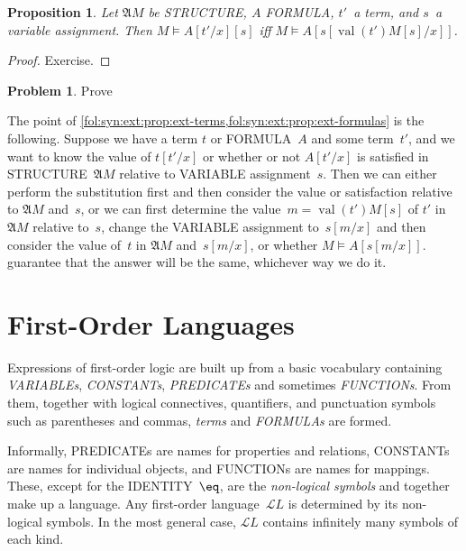 \documentclass[10pt,a4paper]{article}
\makeatletter
\newcommand*{\olup}[1]{\MakeUppercase{#1}}
\theoremstyle{plain}
\newtheorem{prop}[thm]{Proposition}
\theoremstyle{definition}
\newtheorem{prob}{Problem}[section]
\theoremstyle{remark}
\newenvironment{explain}{}{}
\newcommand*{\olfileid}[3]{}
\newcommand*{\olsection}[1]{\section*{#1}}
\newcommand*{\ollabel}[1]{\label{#1}}
\newcommand{\olref}{\@ifnextchar[{\olref@i}{\olref@final}}
\def\olref@i[#1]{\@ifnextchar[{\olref@ii}{\olref@final}}
\def\olref@ii[#1]{\@ifnextchar[{\olref@iii}{\olref@final}}
\def\olref@iii[#1]{\olref@final}
\def\olref@final#1{\ref{#1}}
\providecommand{\Subst}[3]{#1[#2/#3]}
\providecommand{\Struct}{\ensuremath{\mathfrak{A}}}
\providecommand{\Sat}[2]{\ensuremath{#1 \models #2}}
\providecommand{\Lang}{\ensuremath{\mathcal{L}}}
\providecommand{\Value}[1]{\operatorname{val}(#1)}
\providecommand{\cref}[1]{\ref{#1}}
\makeatother
\begin{document}
\begin{prop}\ollabel{prop:ext-formulas} Let $\Struct M$ be
\olup{structure}, $A$ \olup{formula}, $t'$~a term, and $s$~a variable
assignment. Then $\Sat{M}{\Subst{A}{t'}{x}}[s]$ iff
$\Sat{M}{A}[\Subst{s}{\Value{t'}{M}[s]}{x}]$.
\end{prop}

\begin{proof}
Exercise.
\end{proof}

\begin{prob}
Prove \olref[fol][syn][ext]{prop:ext-formulas}
\end{prob}

\begin{explain}
  The point of
  \cref{fol:syn:ext:prop:ext-terms,fol:syn:ext:prop:ext-formulas} is
  the following. Suppose we have a term $t$ or \olup{formula}~$A$ and
  some term~$t'$, and we want to know the value of $\Subst{t}{t'}{x}$
  or whether or not $\Subst{A}{t'}{x}$ is satisfied in
  \olup{structure}~$\Struct M$ relative to \olup{variable} assignment~$s$.
  Then we can either perform the substitution first and then consider
  the value or satisfaction relative to $\Struct{M}$ and~$s$, or we
  can first determine the value~$m = \Value{t'}{M}[s]$ of $t'$ in
  $\Struct{M}$ relative to~$s$, change the \olup{variable} assignment
  to~$\Subst{s}{m}{x}$ and then consider the value of~$t$ in
  $\Struct{M}$ and~$\Subst{s}{m}{x}$, or whether
  $\Sat{M}{A}[\Subst{s}{m}{x}]$.
  guarantee that the answer will be the same, whichever way we do it.
\end{explain}





\olfileid{fol}{syn}{fol}

\olsection{First-Order Languages}


Expressions of first-order logic are built up from a basic vocabulary
containing \emph{\olup{variable}s}, \emph{\olup{constant}s},
\emph{\olup{predicate}s} and sometimes \emph{\olup{function}s}.  From them,
together with logical connectives, quantifiers, and punctuation
symbols such as parentheses and commas, \emph{terms} and
\emph{\olup{formula}s} are formed.

\begin{explain}
Informally, \olup{predicate}s are names for properties and relations,
\olup{constant}s are names for individual objects, and \olup{function}s are
names for mappings.  These, except for the \olup{identity}~$\eq$, are the
\emph{non-logical symbols} and together make up a language.  Any
first-order language~$\Lang L$ is determined by its non-logical
symbols.  In the most general case, $\Lang L$ contains infinitely many
symbols of each kind.
\end{explain}
\end{document}
